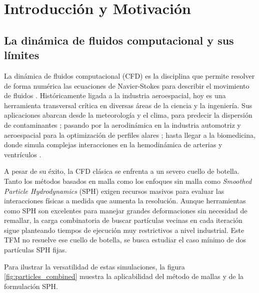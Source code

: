 
\chapter{Introducción y Motivación}

\section{La dinámica de fluidos computacional y sus límites}

La dinámica de fluidos computacional (CFD) es la disciplina que permite resolver de forma numérica las ecuaciones de Navier-Stokes para describir el movimiento de fluidos \cite{Raman2018CFDReview}. Históricamente ligada a la industria aeroespacial, hoy es una herramienta transversal crítica en diversas áreas de la ciencia y la ingeniería. Sus aplicaciones abarcan desde la meteorología y el clima, para predecir la dispersión de contaminantes \cite{Pantusheva2022PollutionCFD}; pasando por la aerodinámica en la industria automotriz y aeroespacial para la optimización de perfiles alares \cite{Slotnick2014CFDV2030}; hasta llegar a la biomedicina, donde simula complejas interacciones en la hemodinámica de arterias y ventrículos \cite{Toma2017SPHBiomedical}. 

A pesar de su éxito, la CFD clásica se enfrenta a un severo cuello de botella. Tanto los métodos basados en malla como los enfoques sin malla como \emph{Smoothed Particle Hydrodynamics} (SPH) exigen recursos masivos para evaluar las interacciones físicas a medida que aumenta la resolución. Aunque herramientas como SPH son excelentes para manejar grandes deformaciones sin necesidad de remallar, la carga combinatoria de buscar partículas vecinas en cada iteración sigue planteando tiempos de ejecución muy restrictivos a nivel industrial. Este TFM no resuelve ese cuello de botella, se busca estudiar el caso mínimo de dos partículas SPH fijas.

Para ilustrar la versatilidad de estas simulaciones, la figura \ref{fig:particles_combined} muestra la aplicabilidad del método de mallas y de la formulación SPH.

